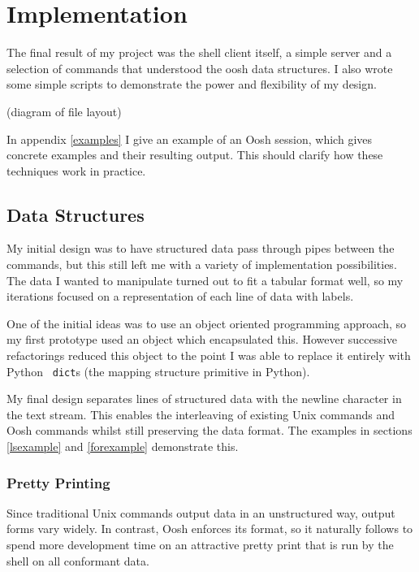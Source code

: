 \documentclass[12pt,twoside,notitlepage]{report}
\begin{document}

\cleardoublepage

\chapter{Implementation}
The final result of my project was the shell client itself, a simple server and
a selection of commands that understood the oosh data structures. I also wrote
some simple scripts to demonstrate the power and flexibility of my design.

(diagram of file layout)

In appendix \ref{examples} I give an example of an Oosh session, which
gives concrete examples and their resulting output. This should clarify how
these techniques work in practice.

\section{Data Structures}
My initial design was to have structured data pass through pipes between the
commands, but this still left me with a variety of implementation
possibilities. The data I wanted to manipulate turned out to fit a tabular
format well, so my iterations focused on a representation of each line of data
with labels. %

One of the initial ideas was to use an object oriented programming approach, so
my first prototype %
used an object which encapsulated this. However successive refactorings reduced
this object to the point I was able to replace it entirely with Python {\tt
  dict}s (the mapping structure primitive in Python).

My final design separates lines of structured data with the newline character in
the text stream. This enables the interleaving of existing Unix commands and
Oosh commands whilst still preserving the data format. The examples in sections
\ref{lsexample} and \ref{forexample} demonstrate this.

\subsection{Pretty Printing}
Since traditional Unix commands output data in an unstructured way, output forms
vary widely. In contrast, Oosh enforces its format, so it naturally follows to
spend more development time on an attractive pretty print that is run by the
shell on all conformant data.
\end{document}
